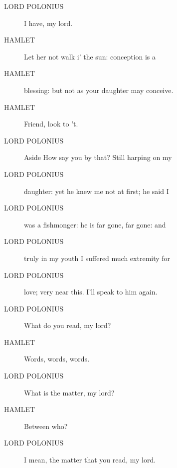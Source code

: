 \documentclass{article}
\begin{document}
\begin{description}
            
\item[LORD POLONIUS] I have, my lord.
\end{description}
          
\begin{description}
            
\item[HAMLET] Let her not walk i' the sun: conception is a
\item[HAMLET] blessing: but not as your daughter may conceive.
\item[HAMLET] Friend, look to 't.
\end{description}
          
\begin{description}
            
\item[LORD POLONIUS] 
               Aside  How say you by that? Still harping on my
\item[LORD POLONIUS] daughter: yet he knew me not at first; he said I
\item[LORD POLONIUS] was a fishmonger: he is far gone, far gone: and
\item[LORD POLONIUS] truly in my youth I suffered much extremity for
\item[LORD POLONIUS] love; very near this. I'll speak to him again.
\item[LORD POLONIUS] What do you read, my lord?
\end{description}
          
\begin{description}
            
\item[HAMLET] Words, words, words.
\end{description}
          
\begin{description}
            
\item[LORD POLONIUS] What is the matter, my lord?
\end{description}
          
\begin{description}
            
\item[HAMLET] Between who?
\end{description}
          
\begin{description}
            
\item[LORD POLONIUS] I mean, the matter that you read, my lord.
\end{description}
          
\end{document}
